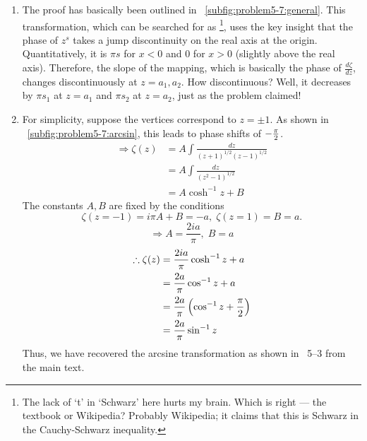 \begin{enumerate}[wide, labelindent = 0pt, label = (\alph*)]
\item
The proof has basically been outlined in ~\ref{subfig:problem5-7:general}.
This transformation, which can be searched for as%
%
\footnote{The lack of `t' in `Schwarz' here hurts my brain.
Which is right --- the textbook or Wikipedia?
Probably Wikipedia; it claims that this is Schwarz in the Cauchy-Schwarz inequality.},
uses the key insight that the phase of $z^s$ takes a jump discontinuity
on the real axis at the origin.
Quantitatively, it is $\pi s$ for $x < 0$ and $0$ for $x > 0$ (slightly above the real axis).
Therefore, the slope of the mapping, which is basically the phase of $\frac{d\zeta}{dz}$,
changes discontinuously at $z = a_1, a_2$.
How discontinuous? Well, it decreases by $\pi s_1$ at $z = a_1$ and $\pi s_2$ at $z = a_2$,
just as the problem claimed!

\item
For simplicity, suppose the vertices correspond to $z = \pm 1$.
As shown in ~\ref{subfig:problem5-7:arcsin}, this leads to phase shifts of $-\frac{\pi}{2}$.
\begin{align*}
    \Rightarrow \zeta(z)
    &= A\int \frac{dz}{{(z + 1)}^{1/2} {(z - 1)}^{1/2}} \\
    &= A\int \frac{dz}{{\left( z^2 - 1 \right)}^{1/2}} \\
    &= A\cosh^{-1} z + B
\end{align*}
The constants $A, B$ are fixed by the conditions
\[
    \zeta(z=-1) = i\pi A + B = -a,\; \zeta(z=1) = B = a.
\]
\[
    \Rightarrow A = \frac{2ia}{\pi},\; B = a
\]
\begin{align*}
    \therefore \zeta(z)
    &= \frac{2ia}{\pi} \cosh^{-1} z + a \\
    &= \frac{2a}{\pi} \cos^{-1} z + a \\
    &= \frac{2a}{\pi} \left( \cos^{-1} z + \frac{\pi}{2} \right) \\
    &= \frac{2a}{\pi} \sin^{-1} z
\end{align*}
Thus, we have recovered the arcsine transformation as shown in ~5--3 from the main text.

\end{enumerate}
